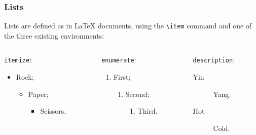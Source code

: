 \documentclass[10pt,    %
    english,            %
    xcolor=table,       %
    envcountsect,       %
    aspectratio=43      %
]{beamer}
\begin{document}
\begin{frame}
    \frametitle{Lists}
    
    Lists are defined as in \LaTeX{} documents, using the \texttt{\textbackslash{}item} command and one of the three existing environments:
    \begin{columns}[T,onlytextwidth]
        \begin{column}{0.33\textwidth}
            \texttt{itemize}:
            \begin{itemize}
                \item Rock;
                \begin{itemize}
                    \item Paper;
                    \begin{itemize}
                        \item Scissors.
                    \end{itemize}
                \end{itemize}
            \end{itemize}
        \end{column}
        \begin{column}{0.33\textwidth}
            \texttt{enumerate}:
            \begin{enumerate}
                \item First;
                \begin{enumerate}
                    \item Second;
                    \begin{enumerate}
                        \item Third.
                    \end{enumerate}
                \end{enumerate}
            \end{enumerate}
        \end{column}
        \begin{column}{0.33\textwidth}
            \texttt{description}:
            \begin{description}
                \item[Yin] Yang.
                \item[Hot] Cold.
            \end{description}
        \end{column}
    \end{columns}
    
    

\end{frame}
\end{document}
